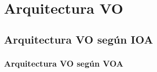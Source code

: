 \section{Arquitectura VO}

\subsection{Arquitectura VO según IOA}

\begin{frame}
\frametitle{Arquitectura VO según VOA}
\end{frame}
